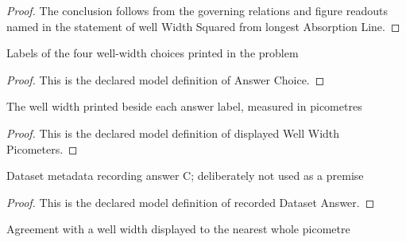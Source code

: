 \begin{proof}
  The conclusion follows from the governing relations and figure readouts named in the statement of well Width Squared from longest Absorption Line.
\end{proof}
\begin{definition}
  \label{def:physics:phyx-mini-0587:phyxminiproblems-problemphyxmini0587-answerchoice}
  Labels of the four well-width choices printed in the problem
\end{definition}
\begin{proof}
  This is the declared model definition of Answer Choice.
\end{proof}
\begin{definition}
  \label{def:physics:phyx-mini-0587:phyxminiproblems-problemphyxmini0587-displayedwellwidthpicometers}
  The well width printed beside each answer label, measured in picometres
\end{definition}
\begin{proof}
  This is the declared model definition of displayed Well Width Picometers.
\end{proof}
\begin{definition}
  \label{def:physics:phyx-mini-0587:phyxminiproblems-problemphyxmini0587-recordeddatasetanswer}
  Dataset metadata recording answer C; deliberately not used as a premise
\end{definition}
\begin{proof}
  This is the declared model definition of recorded Dataset Answer.
\end{proof}
\begin{definition}
  \label{def:physics:phyx-mini-0587:phyxminiproblems-problemphyxmini0587-agreeswhenroundedtonearestpicometer}
  Agreement with a well width displayed to the nearest whole picometre
\end{definition}
